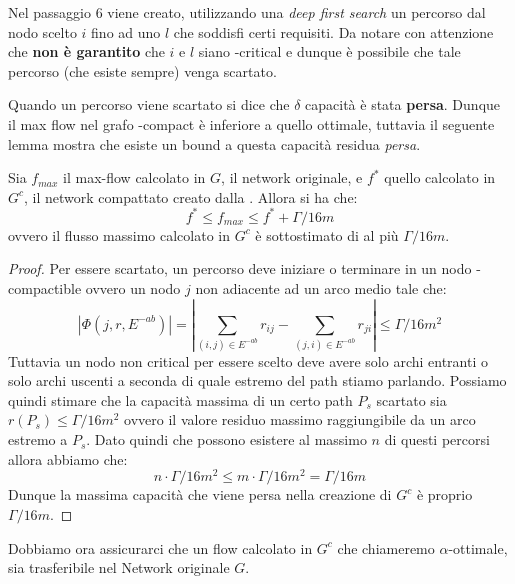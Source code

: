 Nel passaggio 6 viene creato, utilizzando una \textit{deep first search} un percorso dal nodo scelto $i$ fino ad uno $l$ che soddisfi certi requisiti.
Da notare con attenzione che \textbf{non è garantito} che $i$ e $l$ siano \gmm-critical e dunque è possibile che tale percorso (che esiste sempre) venga scartato.

Quando un percorso viene scartato si dice che $\delta$ capacità è stata \textbf{persa}. 
Dunque il max flow nel grafo \gmm-compact è inferiore a quello ottimale, tuttavia il seguente lemma mostra che esiste un bound a questa capacità residua \textit{persa}.
\begin{lemma} \label{boundlose}
    Sia $f_{max}$ il max-flow calcolato in $G$, il network originale, e $f^*$ quello calcolato in $G^c$, il network compattato creato dalla .
    Allora si ha che:
    \[f^*\le f_{max} \le f^* + \Gamma/16m\]
    ovvero il flusso massimo calcolato in $G^c$ è sottostimato di al più $\Gamma/16m$.
\end{lemma}
\begin{proof}
    Per essere scartato, un percorso deve iniziare o terminare in un nodo \gmm-compactible ovvero un nodo $j$ non adiacente ad un arco medio tale che:
    \[|\Phi (j, r, E^{-ab})| =\left | \sum_{(i,j)\in E^{-ab}} r_{ij}-\sum_{(j,i)\in E^{-ab}} r_{ji}\right |\le \Gamma/16m^2\]
    Tuttavia un nodo non critical per essere scelto deve avere solo archi entranti o solo archi uscenti a seconda di quale estremo del path stiamo parlando.
    Possiamo quindi stimare che la capacità massima di un certo path $P_s$ scartato sia $r(P_s) \le  \Gamma/16m^2$ ovvero il valore residuo massimo raggiungibile da un arco estremo a $P_s$.
    Dato quindi che possono esistere al massimo $n$ di questi percorsi allora abbiamo che: 
    \[n\cdot \Gamma/16m^2 \le m \cdot \Gamma/16m^2 = \Gamma/16m\]
    Dunque la massima capacità che viene persa nella creazione di $G^c$ è proprio $\Gamma/16m$.
\end{proof}

Dobbiamo ora assicurarci che un flow calcolato in $G^c$ che chiameremo $\alpha$-ottimale, sia trasferibile nel Network originale $G$.

